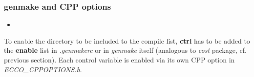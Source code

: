 

\subsubsection{genmake and CPP options}
%
\begin{itemize}
%
\item 
{}
\end{itemize}
%
To enable the directory to be included to the compile list,
{\bf ctrl} has to be added to the {\bf enable} list in
{\it .genmakerc} or in {\it genmake} itself (analogous to {\it cost}
package, cf. previous section).
Each control variable is enabled via its own CPP option
in {\it ECCO\_CPPOPTIONS.h}.

